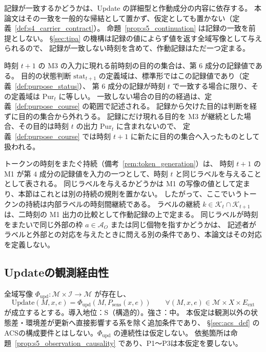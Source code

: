 記録が一致するかどうかは、Update の詳細型と作動成分の内容に依存する。
本論文はその一致を一般的な帰結として置かず、仮定としても置かない（定義~\ref{def:s4_carrier_contract}）。
命題~\ref{prop:s5_continuation} は記録の一致を前提としない。
\S\ref{sec:tipa} の機構は記録の値によらず値を返す全域写像として与えられるので、
記録が一致しない時刻を含めて、作動記録はただ一つ定まる。

\begin{remark}[目的の受け渡し]
\label{rem:s5_purpose_handover}
時刻 $t+1$ の M3 の入力に現れる前時刻の目的の集合は、第 $6$ 成分の記録値である。
目的の状態判断 $\mathrm{stat}_{t+1}$ の定義域は、標準形ではこの記録値であり（定義~\ref{def:purpose_status}）、
第 $6$ 成分の記録が時刻 $t$ で一致する場合に限り、その定義域は $\mathrm{Pur}_t$ に等しい。
一致しない場合の目的の経過は、定義~\ref{def:purpose_course} の範囲で記述される。
記録から欠けた目的は判断を経ずに目的の集合から外れうる。
記録にだけ現れる目的を M3 が継続とした場合、その目的は時刻 $t$ の出力 $\mathrm{Pur}_t$ に含まれないので、
定義~\ref{def:purpose_course} では時刻 $t+1$ に新たに目的の集合へ入ったものとして扱われる。
\end{remark}

\begin{remark}[内部対象トークンの持続]
\label{rem:s5_token_persistence}
トークンの時刻をまたぐ持続（備考~\ref{rem:token_generation}）は、
時刻 $t+1$ の M1 が第 $4$ 成分の記録値を入力の一つとして、時刻 $t$ と同じラベルを与えることとして表される。
同じラベルを与えるかどうかは M1 の写像の値として定まり、本節はこれとは別の持続の規則を置かない。
したがって、ここでいうトークンの持続は内部ラベルの時刻間継続である。
ラベルの継続 $k\in\mathcal K_t\cap\mathcal K_{t+1}$ は、二時刻の M1 出力の比較として作動記録の上で定まる。
同じラベルが時刻をまたいで同じ外部の枠 $a\in\mathcal A_O$ または同じ個物を指すかどうかは、
記述者がラベルと外部との対応を与えたときに問える別の条件であり、本論文はその対応を定義しない。
\end{remark}

\subsection{Updateの観測経由性}
\label{subsec:s5_observation}
\begin{assumption}[Updateの観測経由性]
\label{ass:s5_observation_factorization}
全域写像 $\Phi_{\mathrm{upd}}:\mathcal M\times\mathcal I\to\mathcal M$ が存在し、
\[
\mathrm{Update}(M,x,e)=\Phi_{\mathrm{upd}}(M,P_{\mathrm{sens}}(x,e))
\qquad\forall(M,x,e)\in\mathcal M\times X\times E_{\mathrm{ext}}
\]
が成立するとする。導入地位：S（構造的）。強さ：中。
本仮定は観測以外の状態差・環境差が更新へ直接影響する系を除く追加条件であり、
\S\ref{sec:acs_def} のACSの構成要件とはしない。$\Phi_{\mathrm{upd}}$ の連続性は仮定しない。
依拠箇所は命題~\ref{prop:s5_observation_causality} であり、P1〜P3は本仮定を要しない。
\end{assumption}

